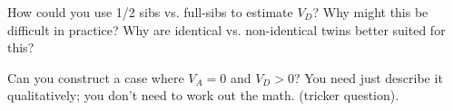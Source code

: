 \begin{question}
How could you use 1/2 sibs vs. full-sibs to estimate $V_D$? Why might
this be difficult in practice? Why are identical vs. non-identical
twins better suited for this? 
\end{question}
\begin{question}
Can you construct a case where $V_A=0$ and $V_D>0$? You need
just describe it qualitatively; you don't need to work out the
math. (tricker question). %
\end{question}


\newpage
